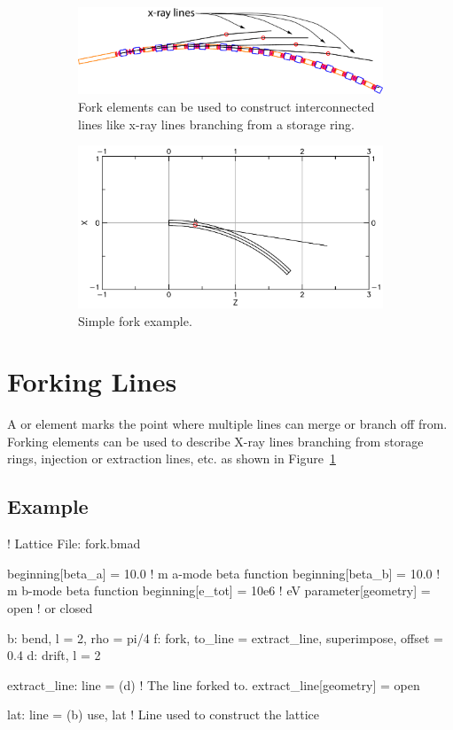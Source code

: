 \documentclass{hitec}
\newcommand{\Section}[1]{\section{#1}\vspace*{-1ex}}
\begin{document}
\begin{figure}[tb]
  \centering
  \begin{subfigure}[b]{0.48\textwidth}
    \includegraphics[width=\textwidth]{x-fork.pdf}
    \caption{Fork elements can be used to construct interconnected lines like x-ray lines branching
      from a storage ring.}
    \label{f:fork}
  \end{subfigure}
  \hfil
  \begin{subfigure}[b]{0.48\textwidth}
    \includegraphics[width=\textwidth]{fork-example.pdf}
    \caption{Simple fork example.}
    \label{f:fork.example}
  \end{subfigure}
  \caption{}
\end{figure}

\Section{Forking Lines}

A  or  element marks the point where multiple lines can merge or branch off from.
Forking elements can be used to describe X-ray lines branching from storage rings, injection or
extraction lines, etc. as shown in Figure~\ref{f:fork}

\subsection{Example}

\begin{code}
! Lattice File: fork.bmad

beginning[beta_a] = 10.0        ! m  a-mode beta function
beginning[beta_b] = 10.0        ! m  b-mode beta function
beginning[e_tot] = 10e6         ! eV 
parameter[geometry] = open      ! or closed

b: bend, l = 2, rho = pi/4
f: fork, to_line = extract_line, superimpose, offset = 0.4
d: drift, l = 2

extract_line: line = (d)       ! The line forked to.
extract_line[geometry] = open

lat: line = (b)
use, lat                ! Line used to construct the lattice
\end{code}
\end{document}
